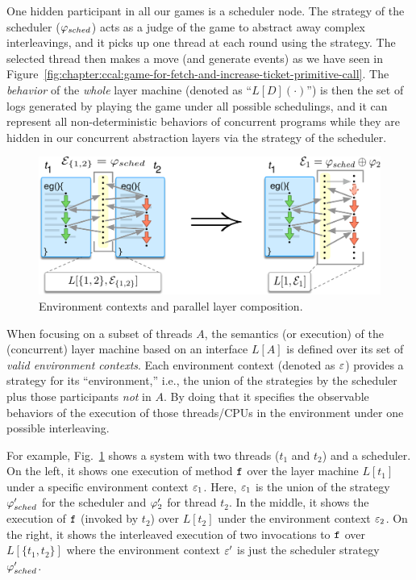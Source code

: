 One hidden participant in all our games is a scheduler node. 
The strategy of the scheduler ($\varphi_{sched}$) acts as a judge of the game to abstract away complex interleavings, 
and it picks up one thread at each round using the strategy. 
The selected thread then makes a move  (and generate events)  as we have seen in Figure~\ref{fig:chapter:ccal:game-for-fetch-and-increase-ticket-primitive-call}.
The \emph{behavior} of the \emph{whole} layer machine (denoted as ``$L[D](\cdot)$'') 
is then the set of  logs generated by playing the game under all possible schedulings, and it can represent all non-deterministic behaviors of concurrent programs 
while they are hidden in our concurrent abstraction layers via the strategy of the scheduler.


\begin{figure}[t]
\centering
\includegraphics[width=\textwidth]{figs/ccal/pcomp}
\caption{Environment contexts and parallel layer composition.}
\label{fig:chapter:ccal:env-contexs-andparallel-layer-composition}
\end{figure}





When focusing on a subset of threads $A$, the semantics (or execution) of the (concurrent) layer machine based on an
interface $L[A]$ is defined over its set of \emph{valid environment
contexts}. 
Each environment context (denoted as $\oracle$) provides a
strategy for its ``environment,'' i.e., the union of the strategies
by the scheduler plus those participants {\em not} in $A$.
By doing that it specifies the observable behaviors of the
execution of those threads/CPUs in the environment under one possible
interleaving.


For example, Fig.~\ref{fig:chapter:ccal:env-contexs-andparallel-layer-composition} shows a system with two threads
($t_1$ and $t_2$) and a scheduler. On the left, it shows one execution
of method ${\mathrm{\texttt{f}}}$ over the layer machine $L[t_1]$ under a specific
environment context $\oracle_1$.  Here, $\oracle_1$ is the union of
the strategy $\varphi'_{sched}$ for the scheduler and $\varphi'_{2}$ for
thread $t_2$. In the middle, it shows the execution of ${\mathrm{\texttt{f}}}$
(invoked by $t_2$) over $L[t_2]$ under the environment context
$\oracle_2$. On the right, it shows the interleaved execution of
two invocations to ${\mathrm{\texttt{f}}}$ over $L[\{t_1,t_2\}]$
where the environment context $\oracle'$ is just the scheduler
strategy $\varphi'_{sched}$.

